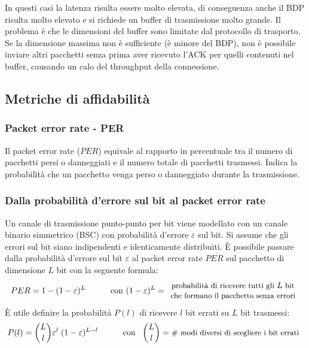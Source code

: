 In questi casi la latenza risulta essere molto elevata, di conseguenza anche il BDP risulta molto elevato e si richiede
un buffer di trasmissione molto grande. Il problema è che le dimensioni del buffer sono limitate dal protocollo di
trasporto. Se la dimensione massima non è sufficiente (è minore del BDP), non è possibile inviare altri pacchetti
senza prima aver ricevuto l'ACK per quelli contenuti nel buffer, causando un calo del throughput della connessione.

\subsection{Metriche di affidabilità}
\subsubsection*{Packet error rate - PER}
Il packet error rate (\(PER\)) equivale al rapporto in percentuale tra il numero di pacchetti persi o danneggiati e il numero
totale di pacchetti trasmessi. Indica la probabilità che un pacchetto venga perso o danneggiato durante la trasmissione.

\subsubsection*{Dalla probabilità d'errore sul bit al packet error rate}
Un canale di trasmissione punto-punto per bit viene modellato con un canale binario simmetrico (BSC) con probabilità
d'errore \(\varepsilon\) sul bit. Si assume che gli errori sul bit siano indipendenti e identicamente distribuiti.
È possibile passare dalla probabilità d'errore sul bit \(\varepsilon\) al packet error rate \(PER\) sul pacchetto
di dimensione \(L\) bit con la seguente formula:
\[PER = 1 - (1 - \varepsilon)^L \qquad\quad \text{con } (1 - \varepsilon)^L = \begin{array}{c} \text{\small probabilità di ricevere tutti gli } L \text{\small ~bit} \\ \text{\small che formano il pacchetto senza errori} \end{array}\]
È utile definire la probabilità \(P(l)\) di ricevere \(l\) bit errati su \(L\) bit trasmessi:
\[P(l) = \binom{L}{l} \varepsilon^l \; (1 - \varepsilon)^{L-l} \qquad\quad \text{con } \begin{array}{c c} \displaystyle \binom{L}{l} = \text{\small \# modi diversi di scegliere i bit errati}\end{array}\]

